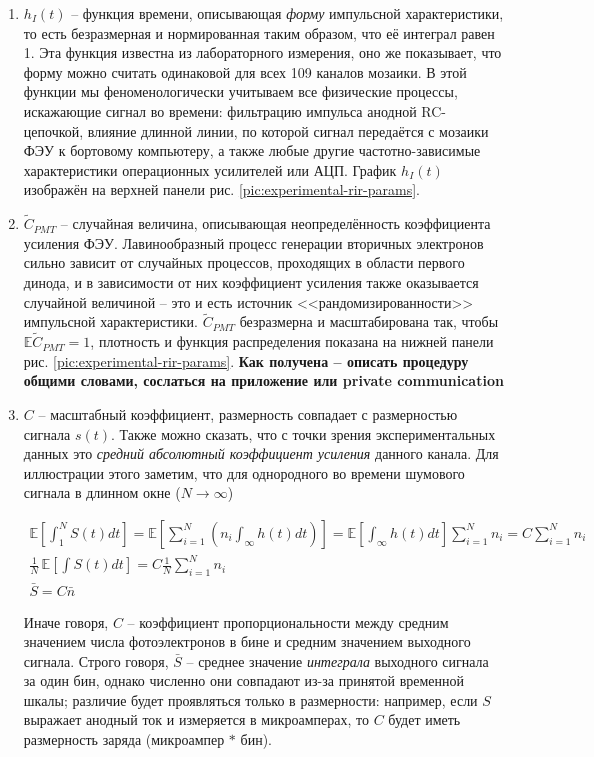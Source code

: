 \begin{enumerate}
	\item $h_I(t)$ -- функция времени, описывающая \textit{форму} импульсной характеристики, то есть безразмерная и нормированная таким образом, что её интеграл равен 1. Эта функция известна из лабораторного измерения, оно же показывает, что форму можно считать одинаковой для всех 109 каналов мозаики. В этой функции мы феноменологически учитываем все физические процессы, искажающие сигнал во времени: фильтрацию импульса анодной RC-цепочкой, влияние длинной линии, по которой сигнал передаётся с мозаики ФЭУ к бортовому компьютеру, а также любые другие частотно-зависимые характеристики операционных усилителей или АЦП. График $h_I(t)$ изображён на верхней панели рис. \ref{pic:experimental-rir-params}.
	\item $\tilde{C}_{PMT}$ -- случайная величина, описывающая неопределённость коэффициента усиления ФЭУ. Лавинообразный процесс генерации вторичных электронов сильно зависит от случайных процессов, проходящих в области первого динода, и в зависимости от них коэффициент усиления также оказывается случайной величиной -- это и есть источник <<рандомизированности>> импульсной характеристики. $\tilde{C}_{PMT}$ безразмерна и масштабирована так, чтобы $\mathbb{E} \tilde{C}_{PMT} = 1$, плотность и функция распределения показана на нижней панели рис. \ref{pic:experimental-rir-params}. \textbf{Как получена -- описать процедуру общими словами, сослаться на приложение или private communication}
	\item $C$ -- масштабный коэффициент, размерность совпадает с размерностью сигнала $s(t)$. Также можно сказать, что с точки зрения экспериментальных данных это \textit{средний абсолютный коэффициент усиления} данного канала. Для иллюстрации этого заметим, что для однородного во времени шумового сигнала в длинном окне ($N \rightarrow \infty$)
	
	\begin{equation}
		\label{eq:C-coeff-description}
		\begin{gathered}
			\mathbb{E} \left[ \int_{1}^{N} S(t) dt \right] = \mathbb{E} \left[ \sum_{i=1}^{N} \left( n_i \int_{\infty} h(t) dt \right) \right] = \mathbb{E} \left[ \int_{\infty} h(t) dt \right] \sum_{i=1}^{N} n_i = C \sum_{i=1}^{N} n_i \\
			\frac{1}{N} \, \mathbb{E} \left[ \int S(t) dt \right] = C \frac{1}{N} \sum_{i=1}^{N} n_i \\
			\bar{S} = C \bar{n}
		\end{gathered}
	\end{equation}
	
	Иначе говоря, $C$ -- коэффициент пропорциональности между средним значением числа фотоэлектронов в бине и средним значением выходного сигнала. Строго говоря, $\bar{S}$ -- среднее значение \textit{интеграла} выходного сигнала за один бин, однако численно они совпадают из-за принятой временной шкалы; различие будет проявляться только в размерности: например, если $S$ выражает анодный ток и измеряется в микроамперах, то $C$ будет иметь размерность заряда (микроампер $*$ бин).
	
\end{enumerate}

